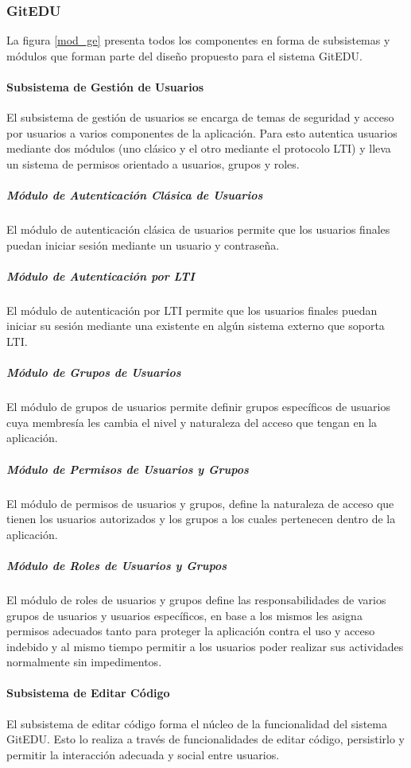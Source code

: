 \subsubsection{GitEDU}

La figura \ref{mod_ge} presenta todos los componentes en forma de subsistemas y módulos que forman parte del diseño propuesto para el sistema GitEDU.

\paragraph{Subsistema de Gestión de Usuarios}
El subsistema de gestión de usuarios se encarga de temas de seguridad y acceso por usuarios a varios componentes de la aplicación. Para esto autentica usuarios mediante dos módulos (uno clásico y el otro mediante el protocolo LTI) y lleva un sistema de permisos orientado a usuarios, grupos y roles.

\subparagraph{Módulo de Autenticación Clásica de Usuarios}
El módulo de autenticación clásica de usuarios permite que los usuarios finales puedan iniciar sesión mediante un usuario y contraseña.

\subparagraph{Módulo de Autenticación por LTI}
El módulo de autenticación por LTI  permite que los usuarios finales puedan iniciar su sesión mediante una existente en algún sistema externo que soporta LTI.

\subparagraph{Módulo de Grupos de Usuarios}
El módulo de grupos de usuarios permite definir grupos específicos de usuarios cuya membresía les cambia el nivel y naturaleza del acceso que tengan en la aplicación.

\subparagraph{Módulo de Permisos de Usuarios y Grupos}
El módulo de permisos de usuarios y grupos, define la naturaleza de acceso que tienen los usuarios autorizados y los grupos a los cuales pertenecen dentro de la aplicación.

\subparagraph{Módulo de Roles de Usuarios y Grupos}
El módulo de roles de usuarios y grupos define las responsabilidades de varios grupos de usuarios y usuarios específicos, en base a los mismos les asigna permisos adecuados tanto para proteger la aplicación contra el uso y acceso indebido y al mismo tiempo permitir a los usuarios poder realizar sus actividades normalmente sin impedimentos.

\paragraph{Subsistema de Editar Código}
El subsistema de editar código forma el núcleo de la funcionalidad del sistema GitEDU. Esto lo realiza a través de funcionalidades de editar código, persistirlo y permitir la interacción adecuada y social entre usuarios.

